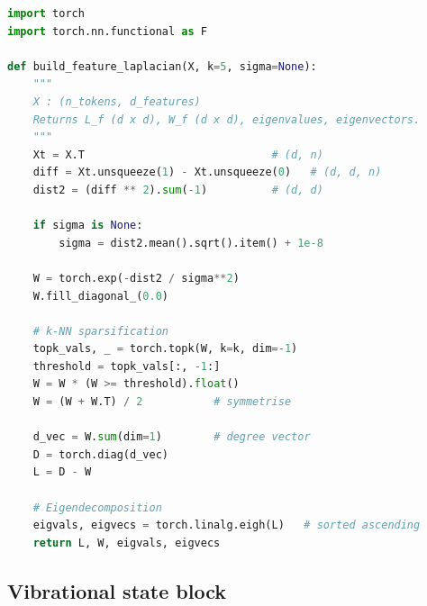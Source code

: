 \documentclass[12pt,a4paper]{article}
\theoremstyle{plain}
\theoremstyle{definition}
\theoremstyle{remark}
\newcommand{\1}{\mathbf{1}}
\begin{document}
\begin{lstlisting}[language=Python,
  caption={Build the feature-space Laplacian from a token embedding matrix.}]
import torch
import torch.nn.functional as F

def build_feature_laplacian(X, k=5, sigma=None):
    """
    X : (n_tokens, d_features)
    Returns L_f (d x d), W_f (d x d), eigenvalues, eigenvectors.
    """
    Xt = X.T                             # (d, n)
    diff = Xt.unsqueeze(1) - Xt.unsqueeze(0)   # (d, d, n)
    dist2 = (diff ** 2).sum(-1)          # (d, d)

    if sigma is None:
        sigma = dist2.mean().sqrt().item() + 1e-8

    W = torch.exp(-dist2 / sigma**2)
    W.fill_diagonal_(0.0)

    # k-NN sparsification
    topk_vals, _ = torch.topk(W, k=k, dim=-1)
    threshold = topk_vals[:, -1:]
    W = W * (W >= threshold).float()
    W = (W + W.T) / 2           # symmetrise

    d_vec = W.sum(dim=1)        # degree vector
    D = torch.diag(d_vec)
    L = D - W

    # Eigendecomposition
    eigvals, eigvecs = torch.linalg.eigh(L)   # sorted ascending
    return L, W, eigvals, eigvecs
\end{lstlisting}

\subsection{Vibrational state block}
\end{document}
